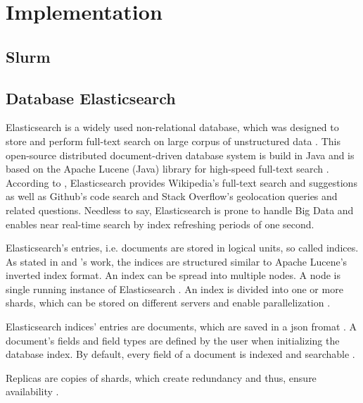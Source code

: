 \newcommand{\databaseName}{Elasticsearch}
\chapter{Implementation}\label{ch:implementation}


\section{Slurm}\label{subsec:slurm}
\cite{slurm2003}




\section{Database Elasticsearch}\label{subsec:db}
\databaseName{} is a widely used non-relational database, which was designed to store and perform full-text search on large corpus of unstructured data \cite{Elasticsearch2017}.
This open-source distributed document-driven database system is build in Java and is based on the Apache Lucene (Java) library for high-speed full-text search \cite{Elasticsearch2017,Elasticsearch2019}.
According to \cite{Elasticsearch2019}, \databaseName{} provides Wikipedia's full-text search and suggestions as well as Github's code search and Stack Overflow's geolocation queries and related questions.
Needless to say, \databaseName{} is prone to handle Big Data and enables near real-time search by index refreshing periods of one second.

\databaseName{}'s entries, i.e. documents are stored in logical units, so called indices.
As stated in \citeauthor{Elasticsearch2019} and \citeauthor{Elasticsearch2017}'s work, the indices are structured similar to Apache Lucene's inverted index format.
An index can be spread into multiple nodes.
A node is single running instance of \databaseName{} \cite{Elasticsearch2019}.
An index is divided into one or more shards, which can be stored on different servers and enable parallelization \cite{Elasticsearch2019}.

\databaseName{} indices' entries are documents, which are saved in a \ac{json} fromat \cite{Elasticsearch2017}.
A document's fields and field types are defined by the user when initializing the database index.
By default, every field of a document is indexed and searchable \cite{Elasticsearch2019}.

Replicas are copies of shards, which create redundancy and thus, ensure availability \cite{Elasticsearch2019}.

